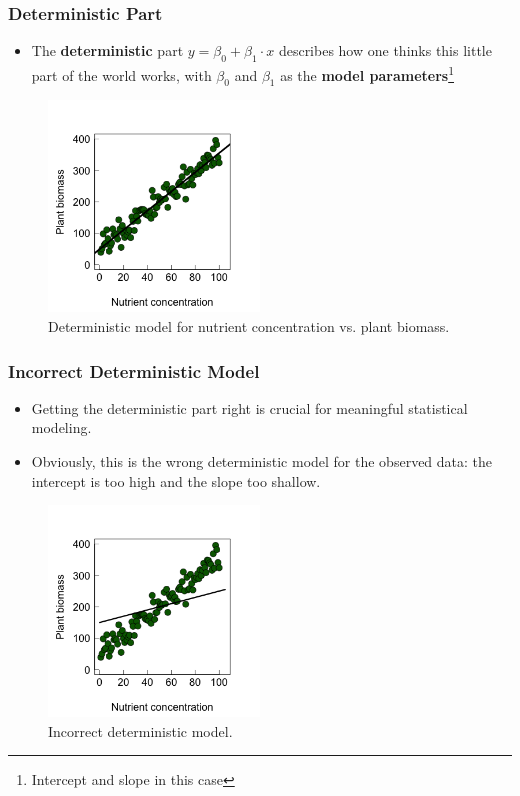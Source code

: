 \documentclass{beamer}
\begin{document}
\begin{frame}
  \frametitle{Deterministic Part}
  \begin{itemize}
    \item The \textbf{deterministic} part $y = \beta_0 + \beta_1 \cdot x$ describes how one thinks this little part of the world works, with $\beta_0$ and $\beta_1$ as the \textbf{model parameters}\footnote{\small Intercept and slope in this case}
  \end{itemize}
  
  \begin{figure}[h]
    \centering
    \includegraphics[width=0.5\textwidth]{lectures/day_2_LM_refresh_I/figures/unnamed-chunk-6-1.png} 
    \caption{Deterministic model for nutrient concentration vs. plant biomass.}
  \end{figure}
\end{frame}

\begin{frame}
  \frametitle{Incorrect Deterministic Model}
  \begin{itemize}
    \item Getting the deterministic part right is crucial for meaningful statistical modeling.
    \item \small Obviously, this is the wrong deterministic model for the observed data: the intercept is too high and the slope too shallow.
  \end{itemize}
  
  \begin{figure}[h]
    \centering
    \includegraphics[width=0.5\textwidth]{lectures/day_2_LM_refresh_I/figures/unnamed-chunk-7-1.png} 
    \caption{Incorrect deterministic model.}
  \end{figure}
\end{frame}
\end{document}
